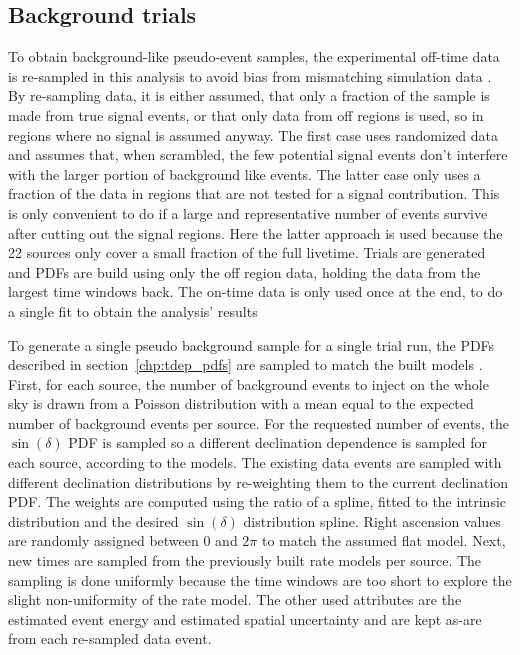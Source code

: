 \subsection*{Background trials}
To obtain background-like pseudo-event samples, the experimental off-time data is re-sampled in this analysis to avoid bias from mismatching simulation data \cite{Aartsen:2016lir}.
By re-sampling data, it is either assumed, that only a fraction of the sample is made from true signal events, or that only data from off regions is used, so in regions where no signal is assumed anyway.
The first case uses randomized data and assumes that, when scrambled, the few potential signal events don't interfere with the larger portion of background like events.
The latter case only uses a fraction of the data in regions that are not tested for a signal contribution.
This is only convenient to do if a large and representative number of events survive after cutting out the signal regions.
Here the latter approach is used because the 22 sources only cover a small fraction of the full livetime.
Trials are generated and PDFs are build using only the off region data, holding the data from the largest time windows back.
The on-time data is only used once at the end, to do a single fit to obtain the analysis' results

To generate a single pseudo background sample for a single trial run, the PDFs described in section~\ref{chp:tdep_pdfs} are sampled to match the built models .
First, for each source, the number of background events to inject on the whole sky is drawn from a Poisson distribution with a mean equal to the expected number of background events per source.
For the requested number of events, the $\sin(\delta)$ PDF is sampled so a different declination dependence is sampled for each source, according to the models.
The existing data events are sampled with different declination distributions by re-weighting them to the current declination PDF.
The weights are computed using the ratio of a spline, fitted to the intrinsic distribution and the desired $\sin(\delta)$ distribution spline.
Right ascension values are randomly assigned between $\num{0}$ and $2\pi$ to match the assumed flat model.
Next, new times are sampled from the previously built rate models per source.
The sampling is done uniformly because the time windows are too short to explore the slight non-uniformity of the rate model.
The other used attributes are the estimated event energy and estimated spatial uncertainty and are kept as-are from each re-sampled data event.

